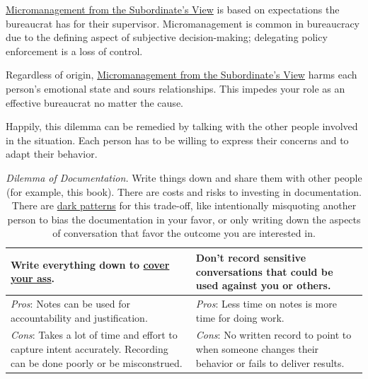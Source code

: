 \hyperref[table:dilemma-personal-solution-provider]{Micromanagement from the Subordinate's View} 
\iftoggle{printedonpaper}{ (\ref{table:dilemma-personal-solution-provider})}{} is 
based on expectations the bureaucrat has for their supervisor. Micromanagement is common in bureaucracy due to the defining aspect of subjective decision-making; delegating policy enforcement is a loss of control. 

Regardless of origin, \hyperref[table:dilemma-personal-solution-provider]{Micromanagement from the Subordinate's View} harms each person's emotional state and sours relationships. This impedes your role as an effective bureaucrat no matter the cause.

Happily, this dilemma can be remedied by talking with the other people involved in the situation. Each person has to be willing to express their concerns and to adapt their behavior. 

\begin{center}
\begin{table}[H] %
\begin{tabular}{ | m{\dilemmatablewidth}| m{\dilemmatablewidth} | } 
  \hline
  \textbf{Write everything down to \href{https://en.wikipedia.org/wiki/Cover_your_ass}{cover your ass}.
  \index{Wikipedia!cover your ass@\string\href{https://en.wikipedia.org/wiki/Cover_your_ass}{cover your ass}}
  } &
  \textbf{Don't record sensitive conversations that could be used against you or others.} \\
  \hline
  \textit{Pros}: Notes can be used for accountability and justification. &
  \textit{Pros}: Less time on notes is more time for doing work. \\
  \hline
  \textit{Cons}: Takes a lot of time and effort to capture intent accurately. Recording can be done poorly or be misconstrued.  & 
  \textit{Cons}: No written record to point to when someone changes their behavior or fails to deliver results. \\
  \hline
\end{tabular}
\caption{\textit{Dilemma of Documentation.}
Write things down and share them with other people (for example, this book). There are costs and risks to investing in documentation. There are \href{https://en.wikipedia.org/wiki/Dark_pattern}{dark patterns}
for this trade-off, like intentionally misquoting another person to bias the documentation in your favor, or only writing down the aspects of conversation that favor the outcome you are interested in.  
}
\label{table:dilemma-personal-notes-or-no-notes}
\end{table}
\end{center}

